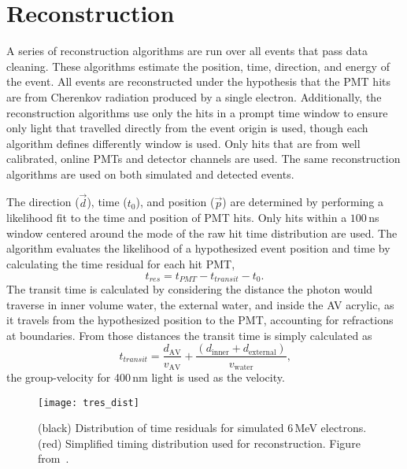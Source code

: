 \section{Reconstruction}
\label{sec:reconstruction}
A series of reconstruction algorithms are run over all events that pass data cleaning.
These algorithms estimate the position, time, direction, and energy of the event.
All events are reconstructed under the hypothesis that the PMT hits are from Cherenkov radiation
produced by a single electron.
Additionally, the reconstruction algorithms use only the hits in a prompt time window to ensure only light
that travelled directly from the event origin is used,
though each algorithm defines differently window is used.
Only hits that are from well calibrated, online PMTs and detector channels are used.
The same reconstruction algorithms are used on both simulated and detected events.

The direction ($\vec{d}$), time ($t_{0}$), and position ($\vec{p}$) are determined by performing a likelihood
fit to the time and position of PMT hits.
Only hits within a $100$\,ns window centered around the mode of the raw hit time
distribution are used.
The algorithm evaluates the likelihood of a hypothesized event position and time by
calculating the time residual for each hit PMT,
\begin{equation}
\label{eqn:tres}
t_{res} = t_{PMT} - t_{transit} - t_{0}\text{.}
\end{equation}
The transit time is calculated by considering the distance the photon would
traverse in inner volume water, the external water, and inside the AV acrylic, as
it travels from the hypothesized position to the PMT, accounting for refractions
at boundaries.
From those distances the transit time is simply calculated as
\begin{equation}
t_{transit} = \frac{d_{\mathrm{AV}}}{v_{\mathrm{AV}}} + \frac{(d_{\mathrm{inner}} + d_{\mathrm{external}})}{v_{\mathrm{water}}}\text{,}
\end{equation}
the group-velocity for 400\,nm light is used as the velocity.

\begin{figure}[htbp]
\centering
\texttt{[image: tres\_dist]}
\caption[Simulated Distribution of $t_{\mathrm{res}}$]{
(black) Distribution of time residuals for simulated 6\,MeV electrons. (red) Simplified
timing distribution used for reconstruction. Figure from~\citep{richie_thesis}.}
\label{fig:tres_dist}
\end{figure}

